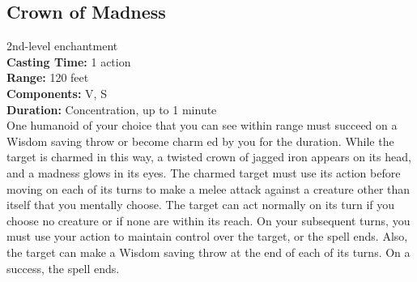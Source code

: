 \documentclass[11pt, A4paper, english]{article}
\begin{document}
		\subsection{Crown of Madness}
2nd-level enchantment \\
\textbf{Casting Time:} 1 action \\
\textbf{Range:} 120 feet \\
\textbf{Components:} V, S \\
\textbf{Duration:} Concentration, up to 1 minute \\
One humanoid of your choice that you can see within range must succeed on a Wisdom saving throw or become charm ed by you for the duration. While the target is charmed in this way, a twisted crown of jagged iron appears on its head, and a madness glows in its eyes. The charmed target must use its action before moving on each of its turns to make a melee attack against a creature other than itself that you mentally choose. The target can act normally on its turn if you choose no creature or if none are within its reach. On your subsequent turns, you must use your action to maintain control over the target, or the spell ends. Also, the target can make a Wisdom saving throw at the end of each of its turns. On a success, the spell ends.
\end{document}
